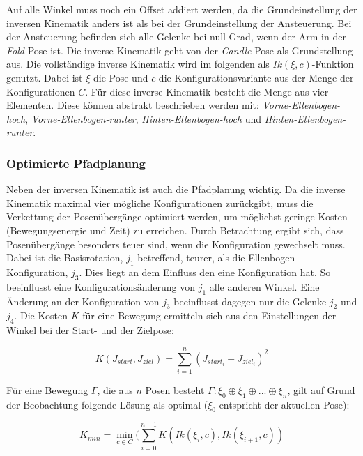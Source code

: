 Auf alle Winkel muss noch ein Offset addiert werden, da die Grundeinstellung der inversen Kinematik anders ist als bei der Grundeinstellung der Ansteuerung. Bei der Ansteuerung befinden sich alle Gelenke bei null Grad, wenn der Arm in der \textit{Fold}-Pose ist. Die inverse Kinematik geht von der \textit{Candle}-Pose als Grundstellung aus. Die vollständige inverse Kinematik wird im folgenden als $Ik(\xi, c)$-Funktion genutzt. Dabei ist $\xi$ die Pose und $c$ die Konfigurationsvariante aus der Menge der Konfigurationen $C$. Für diese inverse Kinematik besteht die Menge aus vier Elementen. Diese können abstrakt beschrieben werden mit: \textit{Vorne-Ellenbogen-hoch}, \textit{Vorne-Ellenbogen-runter}, \textit{Hinten-Ellenbogen-hoch} und \textit{Hinten-Ellenbogen-runter}.

\subsubsection{Optimierte Pfadplanung}
Neben der inversen Kinematik ist auch die Pfadplanung wichtig. Da die inverse Kinematik maximal vier mögliche Konfigurationen zurückgibt, muss die Verkettung der Posenübergänge optimiert werden, um möglichst geringe Kosten (Bewegungsenergie und Zeit) zu erreichen. Durch Betrachtung ergibt sich, dass Posenübergänge besonders teuer sind, wenn die Konfiguration gewechselt muss. Dabei ist die Basisrotation, $j_1$ betreffend, teurer, als die Ellenbogen-Konfiguration, $j_3$. Dies liegt an dem Einfluss den eine Konfiguration hat. So beeinflusst eine Konfigurationsänderung von $j_1$ alle anderen Winkel. Eine Änderung an der Konfiguration von $j_3$ beeinflusst dagegen nur die Gelenke $j_2$ und $j_4$. Die Kosten $K$ für eine Bewegung ermitteln sich aus den Einstellungen der Winkel bei der Start- und der Zielpose:

\begin{equation}
K(J_{start}, J_{ziel}) = \sum_{i=1}^{n} (J_{start_i} - J_{ziel_i})^2
\label{eq:36}
\end{equation}

Für eine Bewegung $\Gamma$, die aus $n$ Posen besteht $\Gamma: \xi_0 \oplus \xi_1 \oplus ... \oplus \xi_n$, gilt auf Grund der Beobachtung folgende Lösung als optimal ($\xi_0$ entspricht der aktuellen Pose):

\begin{equation}
K_{min} = \min_{c \in C}(\sum_{i=0}^{n-1} K(Ik(\xi_i, c), Ik(\xi_{i+1}, c))
\label{eq:37}
\end{equation}


